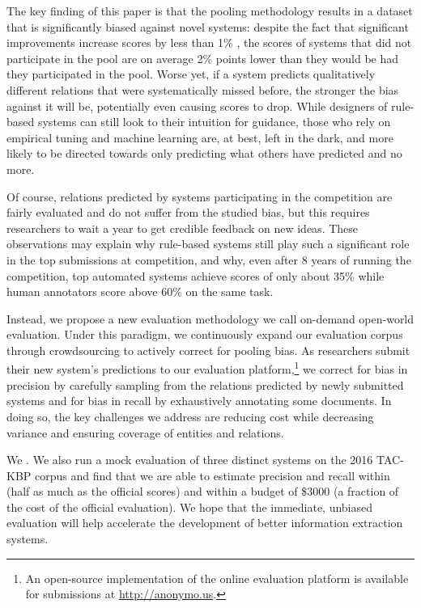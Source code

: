 The key finding of this paper is that the pooling methodology results in a dataset that is significantly biased against novel systems: 
despite the fact that significant improvements increase scores by less than 1\% \fone{},
the \fone{} scores of systems that did not participate in the pool are on average 2\% points lower than they would be had they participated in the pool.
Worse yet, if a system predicts qualitatively different relations that were systematically missed before, the stronger the bias against it will be, potentially even causing scores to drop.
While designers of rule-based systems can still look to their intuition for guidance, those who rely on empirical tuning and machine learning are, at best, left in the dark, and more likely to be directed towards only predicting what others have predicted and no more.

Of course, relations predicted by systems participating in the competition are fairly evaluated and do not suffer from the studied bias, but this requires researchers to wait a year to get credible feedback on new ideas.
%
These observations may explain why rule-based systems still play such a significant role in the top submissions at competition, and why, even after 8 years of running the competition, top automated systems achieve scores of only about 35\% \fone{} while human annotators score above 60\% \fone{} on the same task.

Instead, we propose a new evaluation methodology we call on-demand open-world evaluation.
Under this paradigm, we continuously expand our evaluation corpus through crowdsourcing to actively correct for pooling bias.
As researchers submit their new system's predictions to our evaluation platform,\footnote{%
  An open-source implementation of the online evaluation platform is available for submissions at \url{http://anonymo.us}.
}
  we correct for bias in precision by carefully sampling from the relations predicted by newly submitted systems and
  for bias in recall by exhaustively annotating some documents.
In doing so, the key challenges we address are reducing cost while decreasing variance and ensuring coverage of entities and relations.

We .
We also run a mock evaluation of three distinct systems on the 2016 TAC-KBP corpus and find that we are able to estimate precision and recall within  \fone{} (half as much as the official scores) and within a budget of \$3000 (a fraction of the cost of the official evaluation). 
We hope that the immediate, unbiased evaluation
will help accelerate the development of better information extraction systems.

